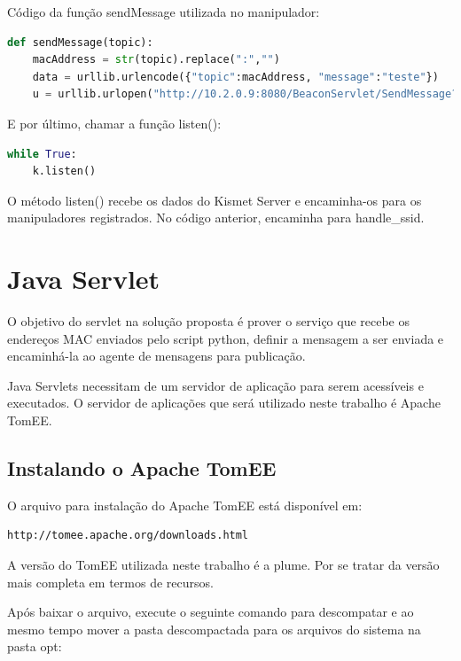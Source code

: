 Código da função sendMessage utilizada no manipulador: \\

\begin{lstlisting}[language=python]
def sendMessage(topic):
	macAddress = str(topic).replace(":","")
	data = urllib.urlencode({"topic":macAddress, "message":"teste"})
	u = urllib.urlopen("http://10.2.0.9:8080/BeaconServlet/SendMessage?%s" % data)
\end{lstlisting}

E por último, chamar a função listen(): \\

\begin{lstlisting}[language=python]
while True:
	k.listen()
\end{lstlisting}

O método listen() recebe os dados do Kismet Server e encaminha-os para os manipuladores registrados. No código anterior, encaminha para handle\_ssid.

\section{Java Servlet}
\label{sec:java-servlet}

O objetivo do servlet na solução proposta é prover o serviço que recebe os endereços MAC enviados pelo script python, definir a mensagem a ser enviada e encaminhá-la ao agente de mensagens para publicação.

Java Servlets necessitam de um servidor de aplicação para serem acessíveis e executados. O servidor de aplicações que será utilizado neste trabalho é Apache TomEE.

\subsection{Instalando o Apache TomEE}
\label{sec:instalando-tomee}

O arquivo para instalação do Apache TomEE está disponível em: \\

\begin{lstlisting}
http://tomee.apache.org/downloads.html
\end{lstlisting}

A versão do TomEE utilizada neste trabalho é a plume. Por se tratar da versão mais completa em termos de recursos.

Após baixar o arquivo, execute o seguinte comando para descompatar e ao mesmo tempo mover a pasta descompactada para os arquivos do sistema na pasta opt: \\

